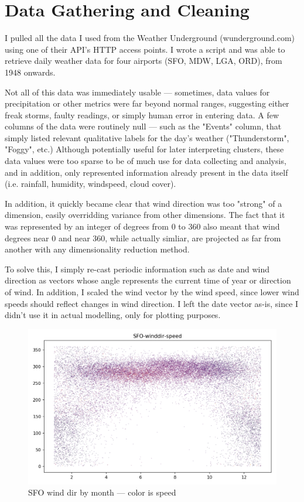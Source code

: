 \documentclass[a4paper]{article}
\begin{document}
\section{Data Gathering and Cleaning}

I pulled all the data I used from the Weather Underground (wunderground.com) using one of their API's HTTP access points. I wrote a script and was able to retrieve daily weather data for four airports (SFO, MDW, LGA, ORD), from 1948 onwards. 

Not all of this data was immediately usable --- sometimes, data values for precipitation or other metrics were far beyond normal ranges, suggesting either freak storms, faulty readings, or simply human error in entering data. A few columns of the data were routinely null --- such as the "Events" column, that simply listed relevant qualitative labels for the day's weather ("Thunderstorm", "Foggy", etc.) Although potentially useful for later interpreting clusters, these data values were too sparse to be of much use for data collecting and analysis, and in addition, only represented information already present in the data itself (i.e. rainfall, humidity, windspeed, cloud cover). 

In addition, it quickly became clear that wind direction was too "strong" of a dimension, easily overridding variance from other dimensions. The fact that it was represented by an integer of degrees from 0 to 360 also meant that wind degrees near 0 and near 360, while actually simliar, are projected as far from another with any dimensionality reduction method. 

To solve this, I simply re-cast periodic information such as date and wind direction as vectors whose angle represents the current time of year or direction of wind. In addition, I scaled the wind vector by the wind speed, since lower wind speeds should reflect changes in wind direction. I left the date vector as-is, since I didn't use it in actual modelling, only for plotting purposes.
 
\begin{figure}[t]
  \centering
  \includegraphics[width=\linewidth]{../png/basic-vis/SFO-winddir-speed.png}
  \caption{SFO wind dir by month --- color is speed}
  \label{fig:SFO_dir_speed}
\end{figure}
\end{document}
